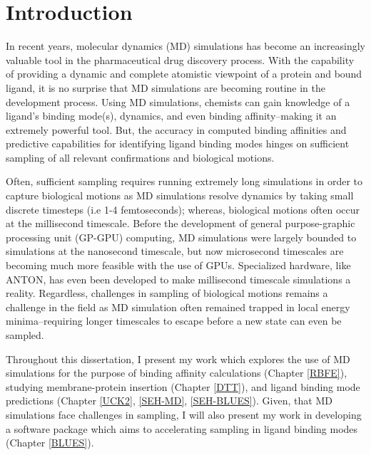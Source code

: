 \chapter*{Introduction} \label{introduction}

In recent years, molecular dynamics (MD) simulations has become an increasingly valuable tool in the pharmaceutical drug discovery process.
With the capability of providing a dynamic and complete atomistic viewpoint of a protein and bound ligand, it is no surprise that MD simulations are becoming routine in the development process.
Using MD simulations, chemists can gain knowledge of a ligand's binding mode(s), dynamics, and even binding affinity--making it an extremely powerful tool.
But, the accuracy in computed binding affinities and predictive capabilities for identifying ligand binding modes hinges on sufficient sampling of all relevant confirmations and biological motions. 

Often, sufficient sampling requires running extremely long simulations in order to capture biological motions as MD simulations resolve dynamics by taking small discrete timesteps (i.e 1-4 femtoseconds); whereas, biological motions often occur at the millisecond timescale.
Before the development of general purpose-graphic processing unit (GP-GPU) computing, MD simulations were largely bounded to simulations at the nanosecond timescale, but now microsecond timescales are becoming much more feasible with the use of GPUs.
Specialized hardware, like ANTON, has even been developed to make millisecond timescale simulations a reality.
Regardless, challenges in sampling of biological motions remains a challenge in the field as MD simulation often remained trapped in local energy minima--requiring longer timescales to escape before a new state can even be sampled.

Throughout this dissertation, I present my work which explores the use of MD simulations for the purpose of binding affinity calculations (Chapter \ref{RBFE}), studying membrane-protein insertion (Chapter \ref{DTT}), and ligand binding mode predictions (Chapter \ref{UCK2}, \ref{SEH-MD}, \ref{SEH-BLUES}).
Given, that MD simulations face challenges in sampling, I will also present my work in developing a software package which aims to accelerating sampling in ligand binding modes (Chapter \ref{BLUES}).


